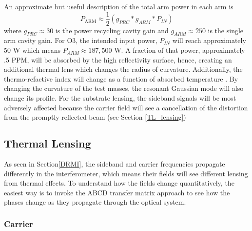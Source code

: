 	An approximate but useful description of the total arm power in each arm is
	\begin{equation}
		P_{\text{ARM}} \approx \frac{1}{2} (g_{PRC} * g_{ARM} * P_{IN})
	\end{equation}
	where $g_{PRC} \approx 30$ is the power recycling cavity gain and $g_{ARM} \approx 250$ is the single arm cavity gain. For O3, the intended input power, $P_{IN}$ will reach approximately 50 W which means $P_{ARM} \approx 187,500$ W. A fraction of that power, approximately .5 PPM, will be absorbed by the high reflectivity surface, hence, creating an additional thermal lens which changes the radius of curvature.  Additionally, the thermo-refactive index will change as a function of absorbed temperature \cite{winkler_thermaldist}.  By changing the curvature of the test masses, the resonant Gaussian mode will also change its profile. For the substrate lensing, the sideband signals will be most adversely affected because the carrier field will see a cancellation of the distortion from the promptly reflected beam (see Section \ref{TL_lensing})
	
	\subsection{Thermal Lensing}\label{Sec:TL_lensing}
	\cite{hiro_thermal_lens}
		As seen in Section\ref{DRMI}, the sideband and carrier frequencies propagate differently in the interferometer, which means their fields will see different lensing from thermal effects. To understand how the fields change quantitatively, the easiest way is to invoke the ABCD transfer matrix approach to see how the phases change as they propagate through the optical system.
		\subsubsection{Carrier}
	

